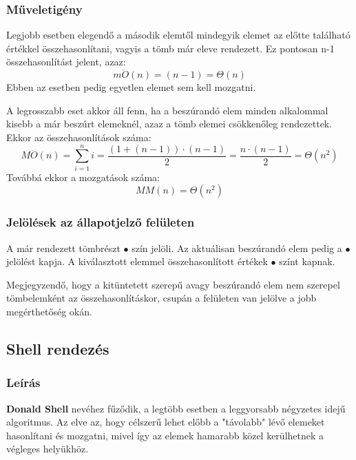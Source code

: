 \documentclass{elteikthesis}
\begin{document}
\subsubsection{Műveletigény}
Legjobb esetben elegendő a második elemtől mindegyik elemet az előtte található értékkel összehasonlítani, vagyis a tömb már eleve rendezett. Ez pontosan n-1 összehasonlítást jelent, azaz:
$$m\ddot{O}(n)=(n-1)=\Theta(n)$$
Ebben az esetben pedig egyetlen elemet sem kell mozgatni.\par
A legrosszabb eset akkor áll fenn, ha a beszúrandó elem minden alkalommal kisebb a már beszúrt elemeknél, azaz a tömb elemei csökkenőleg rendezettek. Ekkor az összehasonlítások száma:
$$M\ddot{O}(n)=\sum\limits_{i=1}^n i = \frac{(1+(n-1))\cdot(n-1)}{2}=\frac{n\cdot(n-1)}{2}=\Theta(n^2)$$
Továbbá ekkor a mozgatások száma:
$$MM(n)=\Theta(n^2)$$
\subsubsection{Jelölések az állapotjelző felületen}
A már rendezett tömbrészt \textcolor{done}{\Huge$\bullet$} szín jelöli. Az aktuálisan beszúrandó elem pedig a \textcolor{select}{\Huge$\bullet$} jelölést kapja. A kiválasztott elemmel összehasonlított értékek \textcolor{swap}{\Huge$\bullet$} színt kapnak.\par
Megjegyzendő, hogy a kitüntetett szerepű avagy beszúrandó elem nem szerepel tömbelemként az összehasonlításkor, csupán a felületen van jelölve a jobb megérthetőség okán.

\subsection{Shell rendezés}
\subsubsection{Leírás}
\textbf{Donald Shell} nevéhez fűződik, a legtöbb esetben a leggyorsabb négyzetes idejű algoritmus. Az elve az, hogy célszerű lehet előbb a "távolabb" lévő elemeket hasonlítani és mozgatni, mivel így az elemek hamarabb közel kerülhetnek a végleges helyükhöz.
\end{document}
